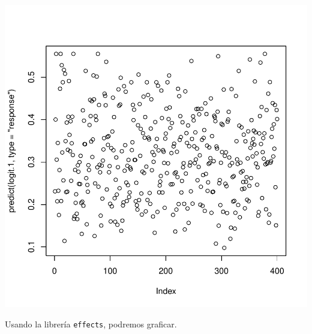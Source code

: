 \documentclass[onesided]{article}\usepackage[]{graphicx}\usepackage[]{color}
\makeatletter
\def\maxwidth{ %
  \ifdim\Gin@nat@width>\linewidth
    \linewidth
  \else
    \Gin@nat@width
  \fi
}
\newenvironment{knitrout}{}{} %
\makeatother
\begin{document}
\begin{knitrout}
{\centering \includegraphics[width=\maxwidth]{figure/predict:1-2} 

}



\end{knitrout}

Usando la librer\'ia \texttt{effects}, podremos graficar. 
\end{document}
